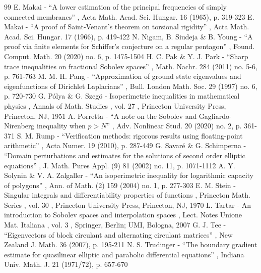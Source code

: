 \documentclass[11pt]{article}
\numberwithin{equation}{section}\newtheorem*{jepEnonce}{\jepEnonceTitle}\newenvironment{enonce*}[1]{\def\jepEnonceTitle{#1}\jepEnonce}{\endjepEnonce}\newtheorem*{conj*}{Conjecture}
\theoremstyle{plain}
\theoremstyle{definition}
\begin{document}
\begin{thebibliography}{99}
 E. Makai - “A lower estimation of the principal frequencies of simply connected membranes” , Acta Math. Acad. Sci. Hungar. 16 (1965), p. 319-323
 E. Makai - “A proof of Saint-Venant’s theorem on torsional rigidity” , Acta Math. Acad. Sci. Hungar. 17 (1966), p. 419-422
 N. Nigam, B. Siudeja \& B. Young - “A proof via finite elements for Schiffer’s conjecture on a regular pentagon” , Found. Comput. Math. 20 (2020) no. 6, p. 1475-1504
 H. C. Pak \& Y. J. Park - “Sharp trace inequalities on fractional Sobolev spaces” , Math. Nachr. 284 (2011) no. 5-6, p. 761-763
 M. M. H. Pang - “Approximation of ground state eigenvalues and eigenfunctions of Dirichlet Laplacians” , Bull. London Math. Soc. 29 (1997) no. 6, p. 720-730
 G. Pólya \& G. Szegö - Isoperimetric inequalities in mathematical physics , Annals of Math. Studies , vol. 27 , Princeton University Press, Princeton, NJ, 1951
 A. Porretta - “A note on the Sobolev and Gagliardo-Nirenberg inequality when $p>N$” , Adv. Nonlinear Stud. 20 (2020) no. 2, p. 361-371
 S. M. Rump - “Verification methods: rigorous results using floating-point arithmetic” , Acta Numer. 19 (2010), p. 287-449
 G. Savaré \& G. Schimperna - “Domain perturbations and estimates for the solutions of second order elliptic equations” , J. Math. Pures Appl. (9) 81 (2002) no. 11, p. 1071-1112
 A. Y. Solynin \& V. A. Zalgaller - “An isoperimetric inequality for logarithmic capacity of polygons” , Ann. of Math. (2) 159 (2004) no. 1, p. 277-303
 E. M. Stein - Singular integrals and differentiability properties of functions , Princeton Math. Series , vol. 30 , Princeton University Press, Princeton, NJ, 1970
 L. Tartar - An introduction to Sobolev spaces and interpolation spaces , Lect. Notes Unione Mat. Italiana , vol. 3 , Springer, Berlin; UMI, Bologna, 2007
 G. J. Tee - “Eigenvectors of block circulant and alternating circulant matrices” , New Zealand J. Math. 36 (2007), p. 195-211
 N. S. Trudinger - “The boundary gradient estimate for quasilinear elliptic and parabolic differential equations” , Indiana Univ. Math. J. 21 (1971/72), p. 657-670
\end{thebibliography}
\end{document}
